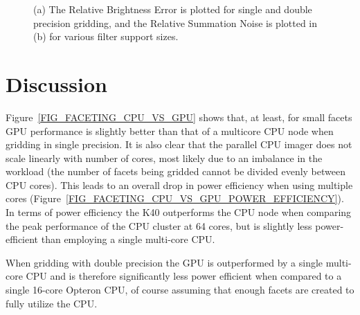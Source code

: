 \begin{figure}[ht!]
\begin{mdframed}
\begin{subfigure}[b]{0.95\textwidth}
    \caption{}
  \end{subfigure}

  \caption[Relative precision error with increasing filter support]{(a) The Relative Brightness Error is plotted for single and double precision gridding, and the Relative Summation Noise is plotted in (b) for various filter support sizes.}
  \label{FIG_RBE_SUP}
  \end{mdframed}
\end{figure}

\section{Discussion}
\label{sec_results_discussion}
Figure~\ref{FIG_FACETING_CPU_VS_GPU} shows that, at least, for small facets GPU performance is slightly better than that of a multicore CPU node when gridding in
single precision. It is also clear that the parallel CPU imager does not scale linearly with number of cores, most likely due to an imbalance in the workload (the number of
facets being gridded cannot be divided evenly between CPU cores). This leads to an overall drop in power
efficiency when using multiple cores (Figure~\ref{FIG_FACETING_CPU_VS_GPU_POWER_EFFICIENCY}). In terms of power efficiency the K40 outperforms the CPU node when 
comparing the peak performance of the CPU cluster at 64 cores, but is slightly less power-efficient than employing a single multi-core CPU.

When gridding with double precision the GPU is outperformed by a single multi-core CPU and is therefore 
significantly less power efficient when compared to a single 16-core Opteron CPU, of course assuming 
that enough facets are created to fully utilize the CPU.

